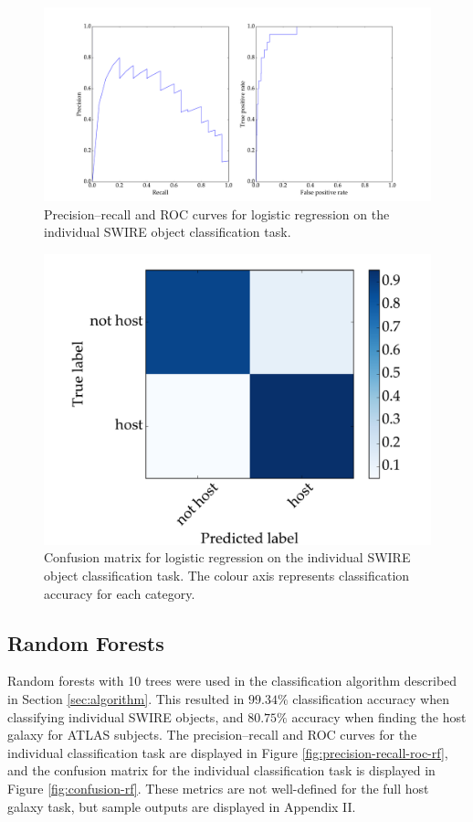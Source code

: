 \documentclass[a4paper]{article}
\newcommand{\fig}{Figure }
\newcommand{\sect}{Section }
\newcommand{\app}{Appendix }
\begin{document}
      \begin{figure}[!ht]
        \centering
        \includegraphics[width=\linewidth]{images/metrics_lr.pdf}
        \caption{Precision--recall and ROC curves for logistic regression on the individual SWIRE object classification task.}
        \label{fig:precision-recall-roc-lr}
      \end{figure}

      \begin{figure}[!ht]
        \centering
        \includegraphics[width=0.5\linewidth]{images/confusion_lr.pdf}
        \caption{Confusion matrix for logistic regression on the individual SWIRE object classification task. The colour axis represents classification accuracy for each category.}
        \label{fig:confusion-lr}
      \end{figure}

    \subsection{Random Forests}

      Random forests with 10 trees were used in the classification algorithm described in \sect \ref{sec:algorithm}. This resulted in $99.34\%$ classification accuracy when classifying individual SWIRE objects, and $80.75\%$ accuracy when finding the host galaxy for ATLAS subjects. The precision--recall and ROC curves for the individual classification task are displayed in \fig \ref{fig:precision-recall-roc-rf}, and the confusion matrix for the individual classification task is displayed in \fig \ref{fig:confusion-rf}. These metrics are not well-defined for the full host galaxy task, but sample outputs are displayed in \app II.
\end{document}
